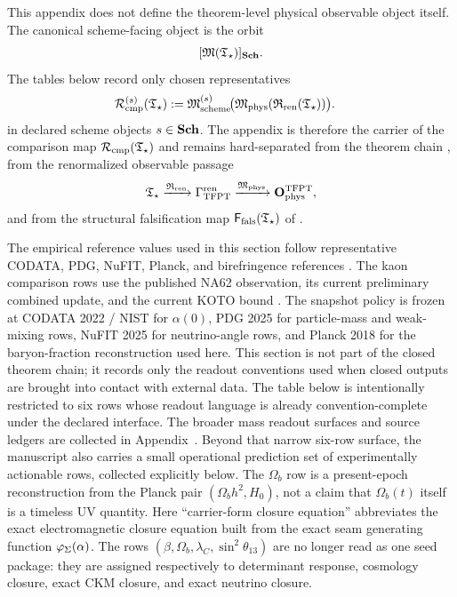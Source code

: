This appendix does not define the theorem-level physical observable object itself. The canonical
scheme-facing object is the orbit
\[
[\mathfrak M(\mathfrak T_{\star})]_{\mathbf{Sch}}.
\]
The tables below record only chosen representatives
\[
\begin{aligned}
\mathcal R_{\mathrm{cmp}}^{(s)}(\mathfrak T_{\star})
&:=
\mathfrak M_{\mathrm{scheme}}^{(s)}\!\bigl(\mathfrak M_{\mathrm{phys}}(\mathfrak R_{\mathrm{ren}}(\mathfrak T_{\star}))\bigr).
\end{aligned}
\]
in declared scheme objects $s\in\mathbf{Sch}$. The appendix is therefore the carrier of the comparison
map $\mathcal R_{\mathrm{cmp}}(\mathfrak T_{\star})$ and remains hard-separated from the theorem chain
, from the renormalized observable passage
\[
\mathfrak T_{\star}\xrightarrow{\mathfrak R_{\mathrm{ren}}}\Gamma_{\mathrm{TFPT}}^{\mathrm{ren}}\xrightarrow{\mathfrak M_{\mathrm{phys}}}\mathbf O_{\mathrm{phys}}^{\mathrm{TFPT}},
\]
and from the structural falsification map $\mathsf F_{\mathrm{fals}}(\mathfrak T_{\star})$ of
.

The empirical reference values used in this section follow representative CODATA, PDG, NuFIT, Planck,
and birefringence references
\cite{codata2022,pdg2025,nufit2025,planck2018,minamiKomatsu2020,eskilt2023,sullivan2025}. The
kaon comparison rows use the published NA62 observation, its current preliminary combined update,
and the current KOTO bound \cite{na62obs2025,na62Moriond2026,koto2024}. The
snapshot policy is frozen at CODATA 2022 / NIST for $\alpha(0)$, PDG 2025 for particle-mass and
weak-mixing rows, NuFIT 2025 for neutrino-angle rows, and Planck 2018 for the baryon-fraction
reconstruction used here. This section is not part of the closed theorem chain; it records only
the readout conventions used when closed outputs are brought into contact with external data.
The table below is intentionally restricted to six rows whose readout language is already
convention-complete under the declared interface. The broader mass readout surfaces and source
ledgers are collected in Appendix~. Beyond that narrow six-row surface, the
manuscript also carries a
small operational prediction set of experimentally actionable rows, collected explicitly below.
The $\Omega_b$ row is a present-epoch reconstruction from the Planck pair $(\Omega_b h^2,H_0)$,
not a claim that $\Omega_b(t)$ itself is a timeless UV quantity. Here \enquote{carrier-form
closure equation} abbreviates the exact electromagnetic closure equation built from the exact seam generating
function $\varphi_{\Sigma}(\alpha)$. The rows $(\beta,\Omega_b,\lambda_C,\sin^2\theta_{13})$ are no longer
read as one seed package: they are assigned respectively to determinant response, cosmology
closure, exact CKM closure, and exact neutrino closure.

